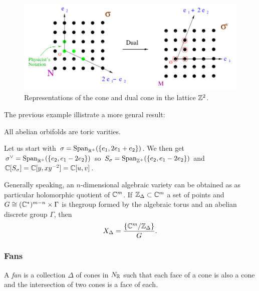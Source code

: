             \begin{figure}[H]
                \centering
                \includegraphics[scale=0.4]{Pictures/toricdiagZ2orbifold.png}
                \caption{Representations of the cone and dual cone in the lattice $\mathbb{Z}^2$.}
            \end{figure}

            The previous example illistrate a more genral result:
            \begin{prop*}
                All abelian orbifolds are toric varities.
            \end{prop*}

            \begin{examp*}
                Let us start with $\sigma=\text{Span}_{\mathbb{R}^+}(\{e_1,2e_1+e_2\})$. We then get $\sigma^\vee=\text{Span}_{\mathbb{R}^+}(\{e_2,e_1-2e_2\})$ so $S_\sigma=\text{Span}_{\mathbb{Z}^+}(\{e_2,e_1-2e_2\})$ and $\mathbb{C}[S_\sigma]=\mathbb{C}[y,xy^{-2}]=\mathbb{C}[u,v]$.
            \end{examp*}

            
            Generally speaking, an $n$-dimensional algebraic variety can be obtained as as particular holomorphic quotient of $\mathbb{C}^m$. If $\mathbb{Z}_\Delta\subset\mathbb{C}^m$ a set of points and $G\cong (\mathbb{C}^*)^{m-n}\times\Gamma$ is thegroup formed by the algebraic torus and an abelian discrete group $\Gamma$, then
            \begin{equation}
                X_\Delta=\frac{\{\mathbb{C}^m/\mathbb{Z}_\Delta\}}{G}.
            \end{equation}

        \subsubsection{Fans}
            
            A \emph{fan} is a collection $\Delta$ of cones in $N_{\mathbb{R}}$ such that each face of a cone is also a cone and the intersection of two cones is a face of each.

